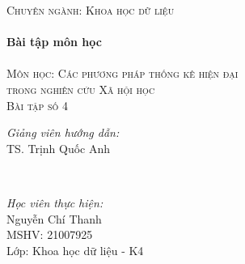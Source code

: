 \documentclass[14pt, a4paper]{article}
\theoremstyle{sltheorem}
\theoremstyle{soltheorem}
\begin{document}
\begin{titlepage}
    \textsc{\Large Chuyên ngành: Khoa học dữ liệu}\\[0.5cm] %



    \HRule \\[0.4cm]
    { \huge \bfseries Bài tập môn học}\\[0.4cm] %
    \HRule \\[1.5cm]

    \textsc{\Large Môn học: Các phương pháp thống kê hiện đại \\ trong nghiên cứu Xã hội học}\\[1cm] %


    \textsc{\Large Bài tập số 4}\\[1cm]


    \begin{minipage}{0.4\textwidth}
        \begin{flushleft} \large
        \emph{Giảng viên hướng dẫn:} \\
        TS. Trịnh Quốc Anh %
        \end{flushleft}
    \end{minipage}\\[0.5cm]

    \begin{minipage}{0.4\textwidth}
    \begin{flushleft} \large
    \emph{Học viên thực hiện:}\\
    Nguyễn Chí Thanh \\
    MSHV: 21007925 \\ %
    Lớp: Khoa học dữ liệu - K4
    \end{flushleft}
    \end{minipage}




\end{titlepage}
\end{document}
